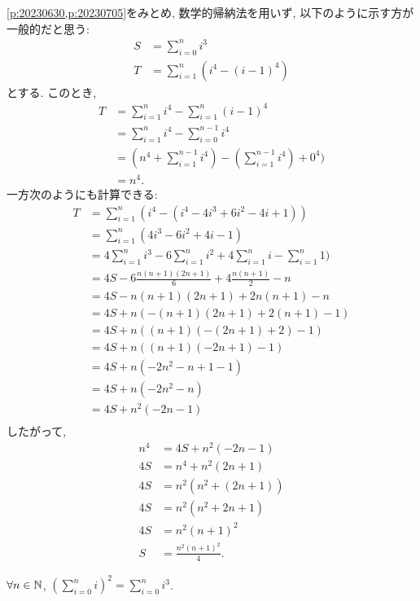 \begin{rem}
  \cref{p:20230630,p:20230705}をみとめ,
  数学的帰納法を用いず, 以下のように示す方が一般的だと思う:
  \begin{align*}
    S&=\sum_{i=0}^n i^3\\
    T&=\sum_{i=1}^{n}(i^4-(i-1)^4)
  \end{align*}
  とする.
  このとき,
  \begin{align*}
    T&=\sum_{i=1}^{n}i^4-\sum_{i=1}^n (i-1)^4\\
    &=\sum_{i=1}^{n}i^4-\sum_{i=0}^{n-1} i^4\\
    &=(n^4+\sum_{i=1}^{n-1}i^4)-(\sum_{i=1}^{n-1} i^4)+0^4)\\
    &=n^4.
  \end{align*}
  一方次のようにも計算できる:
  \begin{align*}
    T
    &=\sum_{i=1}^{n}(i^4- (i^4-4i^3+6i^2-4i+1))\\
    &=\sum_{i=1}^{n}(4i^3-6i^2+4i-1)\\
    &=4\sum_{i=1}^{n}i^3-6\sum_{i=1}^{n}i^2+4\sum_{i=1}^{n}i-\sum_{i=1}^{n}1)\\
    &=4S-6\frac{n(n+1)(2n+1)}{6}+4\frac{n(n+1)}{2}-n\\
    &=4S-n(n+1)(2n+1)+2n(n+1)-n\\
    &=4S+n(-(n+1)(2n+1)+2(n+1)-1)\\
    &=4S+n((n+1)(-(2n+1)+2)-1)\\ 
    &=4S+n((n+1)(-2n+1)-1)\\ 
    &=4S+n(-2n^2-n+1-1)\\ 
    &=4S+n(-2n^2-n)\\ 
    &=4S+n^2(-2n-1)\\ 
 \end{align*}
  したがって,
  \begin{align*}
    n^4&=4S+n^2(-2n-1)\\ 
    4S&=n^4+n^2(2n+1)\\ 
    4S&=n^2(n^2+(2n+1))\\ 
    4S&=n^2(n^2+2n+1)\\ 
    4S&=n^2(n+1)^2\\ 
    S&=\frac{n^2(n+1)^2}{4}.
  \end{align*}
\end{rem}

\begin{prop}
  \label{p:20230715}
  $\forall n\in \mathbb{N}$,
  $\left(\sum_{i=0}^n i\right)^2=\sum_{i=0}^n i^3$.
\end{prop}

